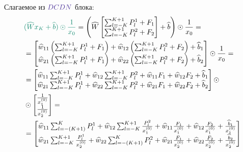 \documentclass{report}
\begin{document}
\par Слагаемое из $\color{Violet}DCDN\color{black}$ блока:
\begin{align*}
    &\color{PineGreen}(\widehat{W}x_K + \widehat{b})\odot\frac{1}{x_0}\color{black} = 
    \left(
        \widehat{W}
        \begin{bmatrix}
            \sum_{l=-K}^{K+1}P_{l}^1 + F_1\\
            \sum_{l=-K}^{K+1}P_{l}^2 + F_2
        \end{bmatrix}
        +
        \widehat{b}
    \right)
    \odot
    \frac{1}{x_0} = \\
    &=
    \begin{bmatrix}
        \widehat{w}_{11}\left(\sum_{l=-K}^{K+1}P_{l}^1 + F_1\right) + \widehat{w}_{12}\left(\sum_{l=-K}^{K+1}P_{l}^2 + F_2\right) + \widehat{b}_1\\
        \widehat{w}_{21}\left(\sum_{l=-K}^{K+1}P_{l}^1 + F_1\right) + \widehat{w}_{22}\left(\sum_{l=-K}^{K+1}P_{l}^2 + F_2\right) + \widehat{b}_2
    \end{bmatrix}
    \odot \frac{1}{x_0}=\\
    &=\begin{bmatrix}
        \widehat{w}_{11}\sum_{l=-K}^{K+1}P_{l}^1 + \widehat{w}_{12}\sum_{l=-K}^{K+1}P_{l}^2+ \widehat{w}_{11}F_1 + \widehat{w}_{12}F_2 + \widehat{b}_1\\
        \widehat{w}_{21}\sum_{l=-K}^{K+1}P_{l}^1 + \widehat{w}_{22}\sum_{l=-K}^{K+1}P_{l}^2 + \widehat{w}_{21}F_1 + \widehat{w}_{22}F_2 + \widehat{b}_2
    \end{bmatrix}\odot\\
    &\odot
    \begin{bmatrix}
        \frac{1}{x_1^{(0)}}\\
        \frac{1}{x_2^{(0)}}
    \end{bmatrix} = \\
    &=
    \begin{bmatrix}
        \widehat{w}_{11}\sum_{l=-(K+1)}^{K}P_{l}^1 + \widehat{w}_{12}\sum_{l=-K}^{K+1}\frac{P_{l}^2}{x_1^{(0)}}+ \widehat{w}_{11}\frac{F_1}{x_1^{(0)}} + \widehat{w}_{12}\frac{F_2}{x_1^{(0)}} + \frac{\widehat{b}_1}{x_1^{(0)}}\\
        \widehat{w}_{21}\sum_{l=-K}^{K+1}\frac{P_{l}^1}{x_2^{(0)}} + \widehat{w}_{22}\sum_{l=-(K+1)}^{K}P_{l}^2 + \widehat{w}_{21}\frac{F_1}{x_2^{(0)}} + \widehat{w}_{22}\frac{F_2}{x_2^{(0)}} + \frac{\widehat{b}_2}{x_2^{(0)}}
    \end{bmatrix}
\end{align*}
\end{document}
